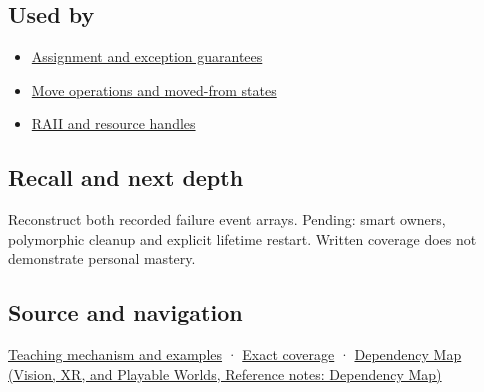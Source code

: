 \subsection{Used by}\label{appendix-9bfe377cef7a-used-by}

\begin{itemize}
\tightlist
\item
  \hyperref[appendix-bea6beb5350f]{Assignment and exception guarantees}
\item
  \hyperref[appendix-5636651017c2]{Move operations and moved-from states}
\item
  \hyperref[appendix-69739d3ab49b]{RAII and resource handles}
\end{itemize}

\subsection{Recall and next depth}\label{appendix-9bfe377cef7a-recall-and-next-depth}

Reconstruct both recorded failure event arrays. Pending: smart owners, polymorphic cleanup and explicit lifetime restart. Written coverage does not demonstrate personal mastery.

\subsection{Source and navigation}\label{appendix-9bfe377cef7a-source-and-navigation}

\hyperref[01-foundations-i-ch003-destruction-closes-the-ownership-interval]{Teaching mechanism and examples} · \hyperref[appendix-fd090d982a15-m009---parts-127-147]{Exact coverage} · \href{../07-Vision-XR-and-Playable-Worlds/main.pdf\#nameddest=appendix-4ad47bdd269a}{Dependency Map (Vision, XR, and Playable Worlds, Reference notes: Dependency Map)}
